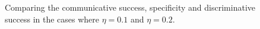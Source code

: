\begin{figure}[p]
	\caption{Comparing the communicative success, specificity and discriminative success in the cases where $\eta=0.1$ and $\eta=0.2$.}
	\label{f:lex:csA01}
\end{figure}
\begin{figure}[p]
	\centering
	\\
	\\

\end{figure}
